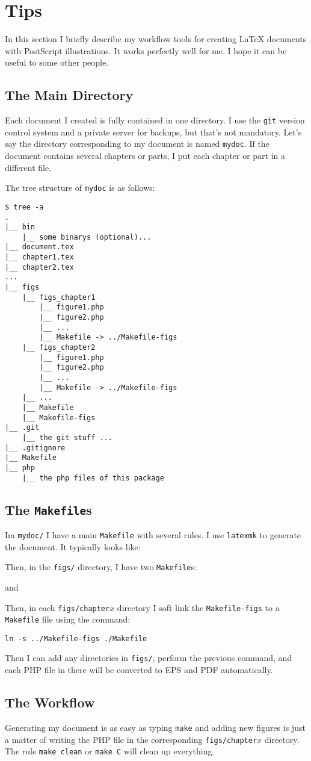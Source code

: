 \documentclass[10pt,a4paper]{scrartcl}
\newcommand\PS{PostScript}
\begin{document}
\section{Tips}
In this section I briefly describe my workflow tools for creating \LaTeX{}
documents with \PS{} illustrations. It works perfectly well for me. I hope it can
be useful to some other people.
\subsection{The Main Directory}
Each document I created is fully contained in one directory. I use the
\texttt{git} version control system and a private server for backups, but
that's not mandatory. Let's say the directory corresponding to my document
is named \texttt{mydoc}. If the document contains several chapters or parts,
I put each chapter or part in a different file.

The tree structure of \texttt{mydoc} is as follows:
\begin{lstlisting}
$ tree -a
.
|__ bin
    |__ some binarys (optional)...
|__ document.tex
|__ chapter1.tex
|__ chapter2.tex
...
|__ figs
    |__ figs_chapter1
        |__ figure1.php
        |__ figure2.php
        |__ ...
        |__ Makefile -> ../Makefile-figs
    |__ figs_chapter2
        |__ figure1.php
        |__ figure2.php
        |__ ...
        |__ Makefile -> ../Makefile-figs
    |__ ...
    |__ Makefile
    |__ Makefile-figs
|__ .git
    |__ the git stuff ...
|__ .gitignore
|__ Makefile
|__ php
    |__ the php files of this package
\end{lstlisting}

\subsection{The \texttt{Makefile}s}
Im \texttt{mydoc/} I have a main \texttt{Makefile} with several rules. I use
\texttt{latexmk} to generate the document. It typically looks like:


Then, in the \texttt{figs/} directory, I have two \texttt{Makefile}s:

and

Then, in each \texttt{figs/chapter$x$} directory I soft link the \texttt{Makefile-figs}
to a \texttt{Makefile} file using the command:
\begin{center}
\texttt{ln -s ../Makefile-figs ./Makefile}
\end{center}
Then I can add any directories in \texttt{figs/}, perform the previous command, and each PHP
file in there will be converted to EPS and PDF automatically.

\subsection{The Workflow}
Generating my document is as easy as typing \lstinline{make} and adding new figures is just a matter
of writing the PHP file in the corresponding \texttt{figs/chapter$x$} directory.
The rule \texttt{make clean} or \texttt{make C} will clean up everything.
\end{document}
